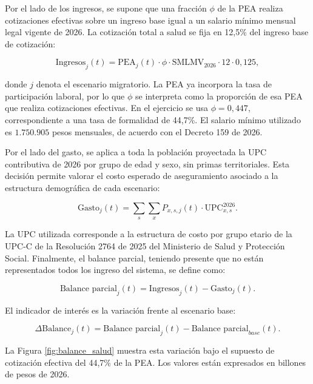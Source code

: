\documentclass[12pt,a4paper]{article}
\begin{document}
Por el lado de los ingresos, se supone que una fracción $\phi$ de la PEA realiza cotizaciones efectivas sobre un ingreso base igual a un salario mínimo mensual legal vigente de 2026. La cotización total a salud se fija en 12,5\% del ingreso base de cotización:

\begin{equation}
\text{Ingresos}_{j}(t)=\text{PEA}_{j}(t)\cdot \phi \cdot \text{SMLMV}_{2026}\cdot 12 \cdot 0{,}125,
\end{equation}

\noindent donde $j$ denota el escenario migratorio. La PEA ya incorpora la tasa de participación laboral, por lo que $\phi$ se interpreta como la proporción de esa PEA que realiza cotizaciones efectivas. En el ejercicio se usa $\phi=0{,}447$, correspondiente a una tasa de formalidad de 44,7\%. El salario mínimo utilizado es $1.750.905$ pesos mensuales, de acuerdo con el Decreto 159 de 2026.

Por el lado del gasto, se aplica a toda la población proyectada la UPC contributiva de 2026 por grupo de edad y sexo, sin primas territoriales. Esta decisión permite valorar el costo esperado de aseguramiento asociado a la estructura demográfica de cada escenario:

\begin{equation}
\text{Gasto}_{j}(t)=\sum_s\sum_x P_{x,s,j}(t)\cdot \text{UPC}_{x,s}^{2026}.
\end{equation}

\noindent La UPC utilizada corresponde a la estructura de costo por grupo etario de la UPC-C de la Resolución 2764 de 2025 del Ministerio de Salud y Protección Social. Finalmente, el balance parcial, teniendo presente que no están representados todos los ingreso del sistema, se define como:

\begin{equation}
\text{Balance parcial}_{j}(t)=\text{Ingresos}_{j}(t)-\text{Gasto}_{j}(t).
\end{equation}

El indicador de interés es la variación frente al escenario base:

\begin{equation}
\Delta \text{Balance}_{j}(t)=\text{Balance parcial}_{j}(t)-\text{Balance parcial}_{base}(t).
\end{equation}

La Figura \ref{fig:balance_salud} muestra esta variación bajo el supuesto de cotización efectiva del 44,7\% de la PEA. Los valores están expresados en billones de pesos de 2026.
\end{document}
